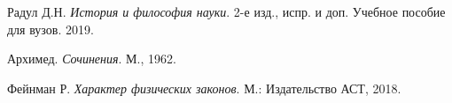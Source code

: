 \begin{thebibliography}{9}

Радул Д.Н. 
\textit{История и философия науки}. 2-е изд., испр. и доп. Учебное пособие для вузов. 2019.

Архимед.
\textit{Сочинения}. М., 1962.

Фейнман Р.
\textit{Характер физических законов}. М.: Издательство АСТ, 2018.

\end{thebibliography}
